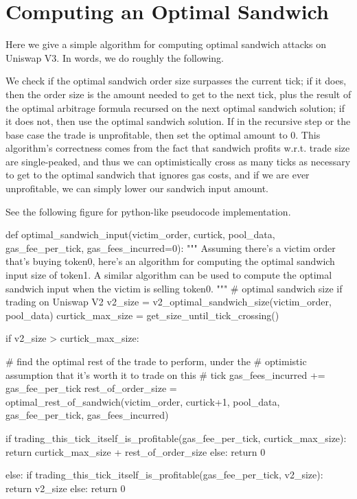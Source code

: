 \section{Computing an Optimal Sandwich} \label{appendix:opt-sandwich}

Here we give a simple algorithm for computing optimal sandwich attacks on Uniswap V3. In words, we do roughly the following.

We check if the optimal sandwich order size surpasses the current tick; if it does, then the order size is the amount needed to get to the next tick, plus the result of the optimal arbitrage formula recursed on the next optimal sandwich solution; if it does not, then use the optimal sandwich solution. If in the recursive step or the base case the trade is unprofitable, then set the optimal amount to 0. This algorithm's correctness comes from the fact that sandwich profits w.r.t. trade size are single-peaked, and thus we can optimistically cross as many ticks as necessary to get to the optimal sandwich that ignores gas costs, and if we are ever unprofitable, we can simply lower our sandwich input amount.

See the following figure for python-like pseudocode implementation.

\label{fig:python-pseudocode}
\begin{python}
    def optimal_sandwich_input(victim_order, curtick, pool_data, gas_fee_per_tick, gas_fees_incurred=0):
        """
        Assuming there's a victim order that's buying token0, here's
        an algorithm for computing the optimal sandwich input size of
        token1. A similar algorithm can be used to compute the optimal
        sandwich input when the victim is selling token0.
        """
        # optimal sandwich size if trading on Uniswap V2
        v2_size = v2_optimal_sandwich_size(victim_order, pool_data)
        curtick_max_size = get_size_until_tick_crossing()
        
        if v2_size > curtick_max_size:

            # find the optimal rest of the trade to perform, under the 
            # optimistic assumption that it's worth it to trade on this 
            # tick
            gas_fees_incurred += gas_fee_per_tick
            rest_of_order_size = optimal_rest_of_sandwich(victim_order, curtick+1, pool_data, gas_fee_per_tick, gas_fees_incurred)
            
            if trading_this_tick_itself_is_profitable(gas_fee_per_tick, curtick_max_size):
                return curtick_max_size + rest_of_order_size
            else:
                return 0
            
        else:
            if trading_this_tick_itself_is_profitable(gas_fee_per_tick, v2_size):
                return v2_size
            else:
                return 0
\end{python}